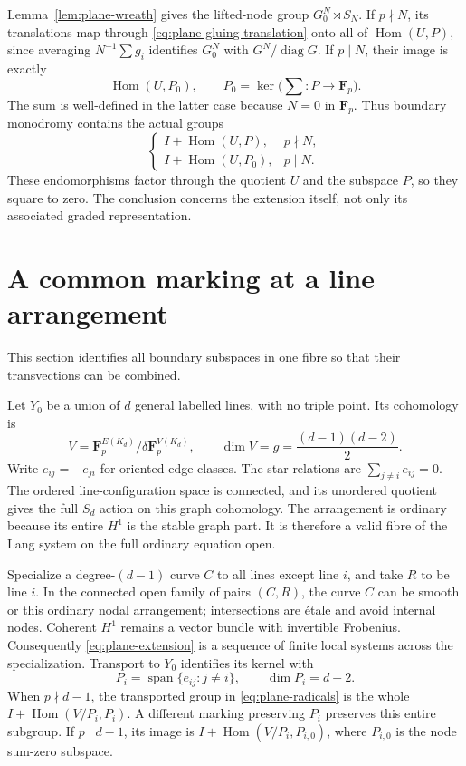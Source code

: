 \documentclass[11pt]{article}
\begin{document}
Lemma~\ref{lem:plane-wreath} gives the lifted-node group $G_0^N\rtimes S_N$. If $p\nmid N$, its translations map through \eqref{eq:plane-gluing-translation} onto all of $\operatorname{Hom}(U,P)$, since averaging $N^{-1}\sum g_i$ identifies $G_0^N$ with $G^N/\operatorname{diag}G$. If $p\mid N$, their image is exactly
\[
 \operatorname{Hom}(U,P_0),\qquad
 P_0=\ker\bigl(\textstyle\sum:P\longrightarrow\mathbf F_p\bigr).
\]
The sum is well-defined in the latter case because $N=0$ in $\mathbf F_p$. Thus boundary monodromy contains the actual groups
\begin{equation}\label{eq:plane-radicals}
 \begin{cases}
 I+\operatorname{Hom}(U,P),&p\nmid N,\\
 I+\operatorname{Hom}(U,P_0),&p\mid N.
 \end{cases}
\end{equation}
These endomorphisms factor through the quotient $U$ and the subspace $P$, so they square to zero. The conclusion concerns the extension itself, not only its associated graded representation.

\section{A common marking at a line arrangement}\label{sec:plane-marking}
This section identifies all boundary subspaces in one fibre so that their transvections can be combined.

Let $Y_0$ be a union of $d$ general labelled lines, with no triple point. Its cohomology is
\[
 V=\mathbf F_p^{E(K_d)}/\delta\mathbf F_p^{V(K_d)},\qquad
 \dim V=g=\frac{(d-1)(d-2)}2.
\]
Write $e_{ij}=-e_{ji}$ for oriented edge classes. The star relations are
$\sum_{j\ne i}e_{ij}=0$. The ordered line-configuration space is connected, and its unordered quotient gives the full $S_d$ action on this graph cohomology. The arrangement is ordinary because its entire $H^1$ is the stable graph part. It is therefore a valid fibre of the Lang system on the full ordinary equation open.

Specialize a degree-$(d-1)$ curve $C$ to all lines except line $i$, and take $R$ to be line $i$. In the connected open family of pairs $(C,R)$, the curve $C$ can be smooth or this ordinary nodal arrangement; intersections are \'etale and avoid internal nodes. Coherent $H^1$ remains a vector bundle with invertible Frobenius. Consequently \eqref{eq:plane-extension} is a sequence of finite local systems across the specialization. Transport to $Y_0$ identifies its kernel with
\[
 P_i=\operatorname{span}\{e_{ij}:j\ne i\},\qquad \dim P_i=d-2.
\]
When $p\nmid d-1$, the transported group in \eqref{eq:plane-radicals} is the whole $I+\operatorname{Hom}(V/P_i,P_i)$. A different marking preserving $P_i$ preserves this entire subgroup. If $p\mid d-1$, its image is $I+\operatorname{Hom}(V/P_i,P_{i,0})$, where $P_{i,0}$ is the node sum-zero subspace.
\end{document}
